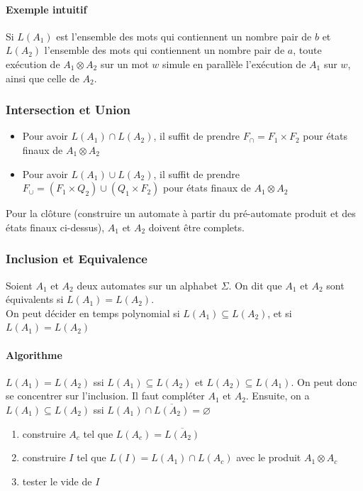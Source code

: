 \documentclass[a4paper]{article}
\begin{document}
  \paragraph{Exemple intuitif} Si $L(A_1)$ est l'ensemble des mots qui 
contiennent
  un nombre pair de $b$ et $L(A_2)$ l'ensemble des mots qui contiennent 
un 
  nombre pair de $a$, toute exécution de $A_1 \otimes A_2$ sur un mot 
$w$ simule
  en parallèle l'exécution de $A_1$ sur $w$, ainsi que celle de $A_2$.

  \subsubsection{Intersection et Union}
  \begin{itemize}
    \item Pour avoir $L(A_1) \cap L(A_2)$, il suffit de prendre $F_\cap 
= F_1 \times F_2$
    pour états finaux de $A_1 \otimes A_2$
    \item Pour avoir $L(A_1) \cup L(A_2)$, il suffit de prendre $F_\cup 
= (F_1 \times Q_2) \cup (Q_1 \times F_2)$
    pour états finaux de $A_1 \otimes A_2$
  \end{itemize}
  Pour la clôture (construire un automate à partir du pré-automate 
produit et des états
  finaux ci-dessus), $A_1$ et $A_2$ doivent être complets.

  \subsubsection{Inclusion et Equivalence}
  Soient $A_1$ et $A_2$ deux automates sur un alphabet $\Sigma$. On dit 
que
  $A_1$ et $A_2$ sont équivalents si $L(A_1) = L(A_2)$.\\
  On peut décider en temps polynomial si $L(A_1) \subseteq L(A_2)$, et 
si $L(A_1) = L(A_2)$

  \paragraph{Algorithme}
  $L(A_1) = L(A_2)$ ssi $L(A_1) \subseteq L(A_2)$ et $L(A_2) \subseteq 
L(A_1)$.
  On peut donc se concentrer sur l'inclusion. Il faut compléter $A_1$ et 
$A_2$.
  Ensuite, on a $L(A_1) \subseteq L(A_2)$ ssi $L(A_1) \cap 
\overline{L(A_2)} = \varnothing$
  \begin{enumerate}
    \item construire $A_c$ tel que $L(A_c) = \overline{L(A_2)}$
    \item construire $I$ tel que $L(I) = L(A_1) \cap L(A_c)$ avec le 
produit $A_1 \otimes A_c$
    \item tester le vide de $I$
  \end{enumerate}
\end{document}
